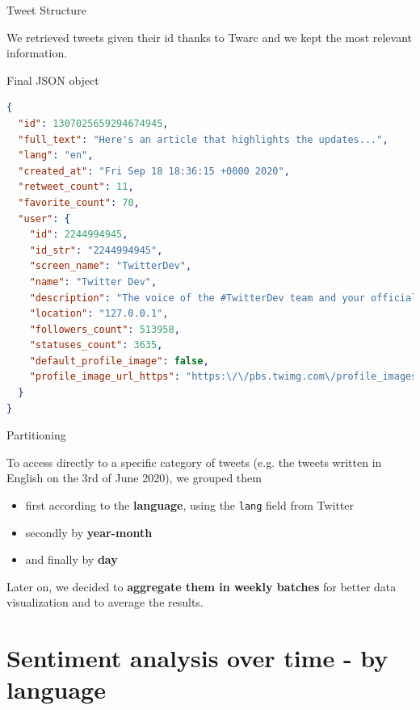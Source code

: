 \documentclass[8pt]{beamer}  %
\begin{document}
\begin{frame}[fragile]{Tweet Structure}

	We retrieved tweets given their id thanks to Twarc and we kept the most relevant information.
	
	\begin{block}{Final JSON object}
    	\begin{lstlisting}[language=json]
{
  "id": 1307025659294674945,
  "full_text": "Here's an article that highlights the updates...",
  "lang": "en",
  "created_at": "Fri Sep 18 18:36:15 +0000 2020",
  "retweet_count": 11,
  "favorite_count": 70,
  "user": {
    "id": 2244994945,
    "id_str": "2244994945",
    "screen_name": "TwitterDev",
    "name": "Twitter Dev",
    "description": "The voice of the #TwitterDev team and your official...",
    "location": "127.0.0.1",
    "followers_count": 513958,
    "statuses_count": 3635,
    "default_profile_image": false,
    "profile_image_url_https": "https:\/\/pbs.twimg.com\/profile_images\/1283786620521652229\/lEODkLTh_normal.jpg"
  }
}
        \end{lstlisting}
	\end{block}
	
\end{frame}

\begin{frame}{Partitioning}

	To access directly to a specific category of tweets (e.g. the tweets written in English on the 3rd of June 2020), we grouped them 
	
	\begin{itemize}
	    \item first according to the \textbf{language}, using the \texttt{lang} field from Twitter
	    \item secondly by \textbf{year-month}
	    \item and finally by \textbf{day}
	\end{itemize}
	
    Later on, we decided to \textbf{aggregate them in weekly batches} for better data visualization and to average the results.

\end{frame}

\section{Sentiment analysis over time - by language}
\end{document}
